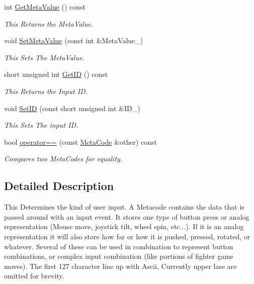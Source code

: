 \begin{DoxyCompactItemize}
int \hyperlink{classphys_1_1MetaCode_ad8e7e4e7c6cdc6a05b8522910ce90cd4}{GetMetaValue} () const 
\begin{DoxyCompactList}\small\item\em This Returns the MetaValue. \item\end{DoxyCompactList}\item 
void \hyperlink{classphys_1_1MetaCode_a31a6390626b08c1bbf08e3f68d2ea764}{SetMetaValue} (const int \&MetaValue\_\-)
\begin{DoxyCompactList}\small\item\em This Sets The MetaValue. \item\end{DoxyCompactList}\item 
short unsigned int \hyperlink{classphys_1_1MetaCode_a70389ebd99493248fe93c598e2fe06c9}{GetID} () const 
\begin{DoxyCompactList}\small\item\em This Returns the Input ID. \item\end{DoxyCompactList}\item 
void \hyperlink{classphys_1_1MetaCode_a0ef70c11c06f0e3015121985cb1b6153}{SetID} (const short unsigned int \&ID\_\-)
\begin{DoxyCompactList}\small\item\em This Sets The input ID. \item\end{DoxyCompactList}\item 
bool \hyperlink{classphys_1_1MetaCode_a506486e5a6f08d50a5af42fa6d48a7f5}{operator==} (const \hyperlink{classphys_1_1MetaCode}{MetaCode} \&other) const 
\begin{DoxyCompactList}\small\item\em Compares two MetaCodes for equality. \item\end{DoxyCompactList}\end{DoxyCompactItemize}


\subsection{Detailed Description}
This Determines the kind of user input. A Metacode contains the data that is passed around with an input event. It stores one type of button press or analog representation (Mouse move, joystick tilt, wheel spin, etc...). If it is an analog representation it will also store how far or how it is pushed, pressed, rotated, or whatever. Several of these can be used in combination to represent button combinations, or complex input combination (like portions of fighter game moves). The first 127 character line up with Ascii, Currently upper lase are omitted for brevity. 

